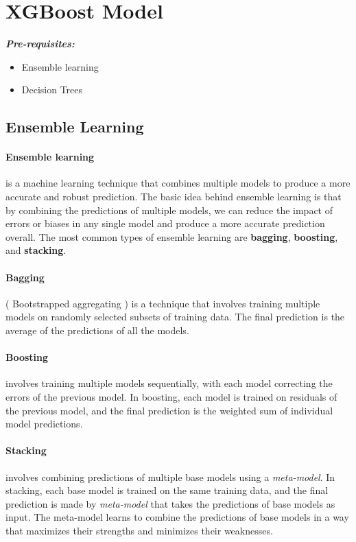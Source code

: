 \documentclass{article}
\begin{document}
\newpage
\section{\centering XGBoost Model}
\vspace{1em}

\textbf{\textit{Pre-requisites:}}
\begin{itemize}
	\item Ensemble learning
	\item Decision Trees
\end{itemize}

\subsection{Ensemble Learning}
\vspace{1em}

\paragraph{Ensemble learning}is a machine learning technique that combines multiple models to produce a more accurate and robust prediction. The basic idea behind ensemble learning is that by combining the predictions of multiple models, we can reduce the impact of errors or biases in any single model and produce a more accurate prediction overall. The most common types of ensemble learning are \textbf{bagging}, \textbf{boosting}, and \textbf{stacking}. 


\paragraph{Bagging}( Bootstrapped aggregating ) is a technique that involves training multiple models on randomly selected subsets of training data. The final prediction is the average of the predictions of all the models. 

\paragraph{Boosting} involves training multiple models sequentially, with each model correcting the errors of the previous model. In boosting, each model is trained on residuals of the previous model, and the final prediction is the weighted sum of individual model predictions. 

\paragraph{Stacking} involves combining predictions of multiple base models using a \textit{meta-model}. In stacking, each base model is trained on the same training data, and the final prediction is made by \textit{meta-model} that takes the predictions of base models as input. The meta-model learns to combine the predictions of base models in a way that maximizes their strengths and minimizes their weaknesses. 
\end{document}
